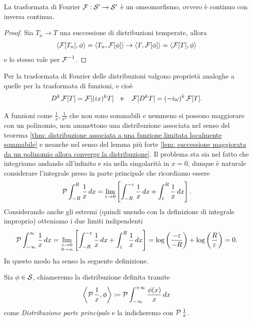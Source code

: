 \begin{lemma}[  ]
  La trasformata di Fourier $ \F:\S' \to \S' $ è un omeomorfismo, ovvero è continuo con inversa continua.
\end{lemma}
\begin{proof}
  Sia $ T_n \to T $ una successione di distribuzioni temperate, allora 
  \begin{align}
    \sc{\F[T_n], \phi} = \sc{T_n, \F[\phi]} \to \sc{T, \F[\phi]} = \sc{\F[T], \phi}
  \end{align}
  e lo stesso vale per $ \F^{-1} $.
\end{proof}

\begin{theorem}[  ]
  Per la trasformata di Fourier delle distribuzioni valgono proprietà analoghe a quelle per la trasformata di funzioni, e cioè 
  \begin{align}
    D^k\F[T] =  \F[(ix)^k T] \quad \textnormal{e} \quad \F[D^kT] = (-i\omega)^k \F[T].
  \end{align}
\end{theorem}

A funzioni come $ \frac1x, \frac1{x^2} $ che non sono sommabili e nemmeno si possono maggiorare con un polinomio, non ammettono una distribuzione 
associata nel senso del teorema \ref{thm: distribuzione associata a una funzione limitata localmente sommabile} e neanche nel senso del lemma 
più forte \ref{lem: successione maggiorata da un polinomio allora converge la distribuzione}. Il problema sta sia nel fatto che integriamo andando 
all'infinito e sia nella singolarità in $ x = 0 $, dunque è naturale considerare l'integrale preso in parte principale che ricordiamo essere 
\begin{align}
  \P \int_{-R}^{R} \frac1x \,dx = \lim_{\eps \to 0} \left[ \int_{-R}^{-\eps} \frac1x \,dx + \int_{\eps}^{R} \frac1x \,dx \right].
\end{align}
Considerando anche gli estremi (quindi unendo con la definizione di integrale improprio) otteniamo i due limiti indipendenti 
\begin{align}
  \P \int_{-\infty}^{\infty} \frac1x \,dx 
  = \lim_{\un{\eps \to 0}{ R \to \infty}} \left[ \int_{-R}^{-\eps} \frac1x \,dx + \int_{\eps}^{R} \frac1x \,dx \right] 
  = \log \left( \frac{-\eps}{-R} \right) + \log \left( \frac{R}{\eps} \right) = 0.
\end{align}
In questo modo ha senso la seguente definizione.
\begin{definition}
  Sia $ \phi \in \S $, chiameremo la distribuzione definita tramite 
  \begin{align}
    \left< \P \frac1x, \phi \right> \coloneq \P \int_{-\infty}^{+\infty} \frac{\phi(x)}{x} \, dx 
  \end{align}
  come \textit{Distribuzione parte principale} e la indicheremo con $ \P \frac1x $.
\end{definition}


